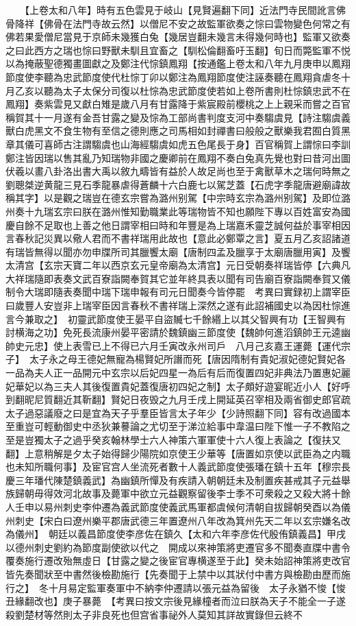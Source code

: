 　　【上卷太和八年】時有五色雲見于岐山【見賢遍翻下同】近法門寺民間訛言佛骨降祥【佛骨在法門寺故云然】以僧尼不安之故監軍欲奏之悰曰雲物變色何常之有佛若果愛僧尼當見于京師未幾獲白兔【幾居豈翻未幾言未得幾何時也】監軍又欲奏之曰此西方之瑞也悰曰野獸未馴且宜畜之【馴松倫翻畜吁玉翻】旬日而斃監軍不悦以為掩蔽聖德獨畫圖獻之及鄭注代悰鎮鳳翔【按通鑑上卷太和八年九月庚申以鳳翔節度使李聽為忠武節度使代杜悰丁卯以鄭注為鳳翔節度使注誣奏聽在鳳翔貪虐冬十月乙亥以聽為太子太保分司復以杜悰為忠武節度使若如上卷所書則杜悰鎮忠武不在鳳翔】奏紫雲見又獻白雉是歲八月有甘露降于紫宸殿前櫻桃之上上親采而嘗之百官稱賀其十一月遂有金吾甘露之變及悰為工部尚書判度支河中奏騶虞見【詩注騶虞義獸白虎黑文不食生物有至信之德則應之司馬相如封禪書曰般般之獸樂我君囿白質黑章其儀可喜師古注謂騶虞也山海經騶虞如虎五色尾長于身】百官稱賀上謂悰曰李訓鄭注皆因瑞以售其亂乃知瑞物非國之慶卿前在鳳翔不奏白兔真先覺也對曰昔河出圖伏羲以畫八卦洛出書大禹以敘九疇皆有益於人故足尚也至于禽獸草木之瑞何時無之劉聰桀逆黄龍三見石季龍暴虐得蒼麟十六白鹿七以駕芝蓋【石虎字季龍唐避廟諱故稱其字】以是觀之瑞豈在德玄宗嘗為潞州别駕【中宗時玄宗為潞州别駕】及即位潞州奏十九瑞玄宗曰朕在潞州惟知勤職業此等瑞物皆不知也願陛下專以百姓富安為國慶自餘不足取也上善之他日謂宰相曰時和年豐是為上瑞嘉禾靈芝誠何益於事宰相因言春秋記災異以儆人君而不書祥瑞用此故也【意此必鄭覃之言】夏五月乙亥詔諸道有瑞皆無得以聞亦勿申牒所司其臘饗太廟【唐制四孟及臘享于太廟唐臘用寅】及饗太清宫【玄宗天寶二年以西京玄元皇帝廟為太清宫】元日受朝奏祥瑞皆停【六典凡大祥瑞隨即表奏文武百寮詣闕奉賀其它並年終具表以聞有司告廟百寮詣闕奉賀又儀制令大瑞即隨表奏聞中瑞下瑞申報有司元日聞奏今皆停罷　考異曰實録初上謂宰臣曰歲豐人安豈非上瑞宰臣因言春秋不書祥瑞上深然之遂有此詔補國史以為因杜悰進言今兼取之】　初靈武節度使王晏平自盜贓七千餘緡上以其父智興有功【王智興有討横海之功】免死長流康州晏平密請於魏鎮幽三節度使【魏帥何進滔鎮帥王元逵幽帥史元忠】使上表雪已上不得已六月壬寅改永州司戶　八月己亥嘉王運薨【運代宗子】　太子永之母王德妃無寵為楊賢妃所譖而死【唐因隋制有貴妃淑妃德妃賢妃各一品為夫人正一品開元中玄宗以后妃四星一為后有后而復置四妃非典法乃置惠妃麗妃華妃以為三夫人其後復置貴妃蓋復唐初四妃之制】太子頗好遊宴昵近小人【好呼到翻昵尼質翻近其靳翻】賢妃日夜毁之九月壬戌上開延英召宰相及兩省御史郎官疏太子過惡議廢之曰是宜為天子乎羣臣皆言太子年少【少詩照翻下同】容有改過國本至重豈可輕動御史中丞狄兼謩論之尤切至于涕泣給事中韋温曰陛下惟一子不教陷之至是豈獨太子之過乎癸亥翰林學士六人神策六軍軍使十六人復上表論之【復扶又翻】上意稍解是夕太子始得歸少陽院如京使王少華等【唐置如京使以武臣為之内職也未知所職何事】及宦官宫人坐流死者數十人義武節度使張璠在鎮十五年【穆宗長慶三年璠代陳楚鎮義武】為幽鎮所憚及有疾請入朝朝廷未及制置疾甚戒其子元益舉族歸朝毋得效河北故事及薨軍中欲立元益觀察留後李士季不可衆殺之又殺大將十餘人壬申以易州刺史李仲遷為義武節度使義武馬軍都虞候何清朝自拔歸朝癸酉以為儀州刺史【宋白曰遼州樂平郡唐武德三年置遼州八年改為箕州先天二年以玄宗嫌名改為儀州】　朝廷以義昌節度使李彦佐在鎮久【太和六年李彦佐代殷侑鎮義昌】甲戌以德州刺史劉約為節度副使欲以代之　開成以來神策將吏遷官多不聞奏直牒中書令覆奏施行遷改殆無虛日【甘露之變之後宦官專横遂至于此】癸未始詔神策將吏改官皆先奏聞狀至中書然後檢勘施行【先奏聞于上禁中以其狀付中書方與檢勘由歷而施行之】　冬十月易定監軍奏軍中不納李仲遷請以張元益為留後　太子永猶不悛【悛丑緣翻改也】庚子暴薨　【考異曰按文宗後見緣橦者而泣曰朕為天子不能全一子遂殺劉楚材等然則太子非良死也但宫省事祕外人莫知其詳故實錄但云終不